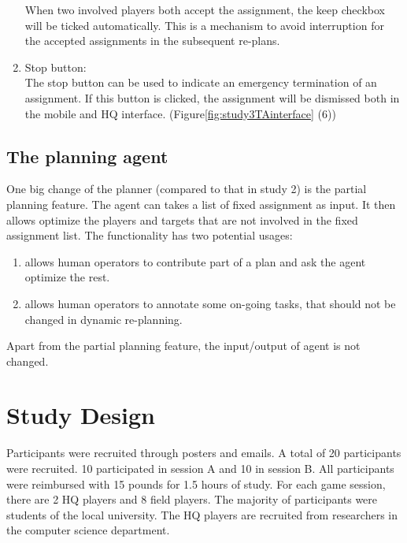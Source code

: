 \begin{enumerate}
When two involved players both accept the assignment, the keep checkbox will be ticked automatically. This is a mechanism to avoid interruption for the accepted assignments in the subsequent re-plans. \\

\item Stop button: \\
The stop button can be used to indicate an emergency termination of an assignment. If this button is clicked, the assignment will be dismissed both in the mobile and HQ interface. (Figure\ref{fig:study3TAinterface} (6)) \\
\end{enumerate}



\subsection{The planning agent}\label{sec:studytwoagent}

One big change of the planner (compared to that in study 2) is the partial planning feature. The agent can takes a list of fixed assignment as input. It then allows optimize the players and targets that are not involved in the fixed assignment list. The functionality has two potential usages: \\

\begin{enumerate}
	\item allows human operators to contribute part of a plan and ask the agent optimize the rest.\\
	\item allows human operators to annotate some on-going tasks, that should not be changed in dynamic re-planning. \\
\end{enumerate}

Apart from the partial planning feature, the input/output of agent is not changed.\\


\section{Study Design}
Participants were recruited through posters and emails. A total of 20 participants were recruited. 10 participated in session A and 10 in session B. All participants were reimbursed with 15 pounds for 1.5 hours of study. For each game session, there are 2 HQ players and 8 field players. The majority of participants were students of the local university. The HQ players are recruited from researchers in the computer science department. \\


